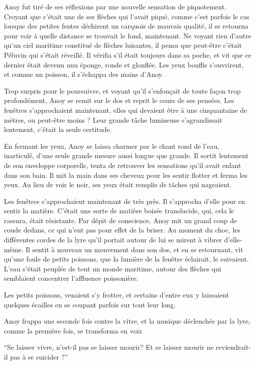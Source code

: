 Anoy fut tiré de ses réflexions par une nouvelle sensation de
piquotement. Croyant que c'était une de ses flèches qui l'avait piqué,
comme c'est parfois le cas lorsque des petites fentes déchirent un
carquois de mauvais qualité, il se retourna pour voir à quelle
distance se trouvait le fond, maintenant. Ne voyant rien d'autre qu'un
ciel maritime constitué de flèches luisantes, il pensa que peut-être
c'était Péluvin qui s'était réveillé. Il vérifia s'il était
toujours dans sa poche, et vit que ce dernier était devenu unu éponge,
ronde et glonflée. Les yeux bouffis s'ouvrirent, et comme un poisson,
il s'échappa des mains d'Anoy.

Trop surpris pour le poursuivre, et voyant qu'il s'enfonçait de toute
façon trop profondément, Anoy se remit sur le dos et reprit le cours
de ses pensées. Les fenêtres s'approchaient maintenant, elles qui
devaient être à une cinquantaine de mètres, ou peut-être moins ? Leur
grande tâche lumineuse s'agrandissait lentement, c'était la seule
certitude.

En fermant les yeux, Anoy se laissa charmer par le chant rond de
l'eau, inarticulé, d'une seule grande mesure aussi longue que
grande. Il sortit lentement de son enveloppe corporelle, tenta de
retrouver les sensations qu'il avait enfant dans son bain. Il mit la
main dans ses cheveux pour les sentir flotter et ferma les yeux. Au
lieu de voir le noir, ses yeux était remplis de tâches qui
nageaient. 

Les fenêtres s'approchaient maintenant de très près. Il s'approcha
d'elle pour en sentir la matière. C'était une sorte de matière boisée
translucide, qui, cela le rassura, était résistante. Par dépit de
conscience, Anoy mit un grand coup de coude dedans, ce qui n'eut pas
pour effet de la briser. Au moment du choc, les différentes cordes de
la lyre qu'il portait autour de lui se mirent à vibrer d'elle-même. Il
sentit à nouveau un mouvement dans son dos, et en se retournant, vit
qu'une foule de petits poissons, que la lumière de la fenêtre
éclairait, le suivaient. L'eau s'était peuplée de tout un monde
maritime, autour des flèches qui semblaient concentrer l'affluence
poissonière.

Les petits poissons, venaient s'y frotter, et certains d'entre eux y
laissaient quelques écailles en se coupant parfois sur tout leur long.

Anoy frappa une seconde fois contre la vitre, et la musique déclenchée
par la lyre, comme la première fois, se transforma en voix 

``Se laisser vivre, n'est-il pas se laisser mourir? Et se laisser
mourir ne reviendrait-il pas à se suicider ?''

